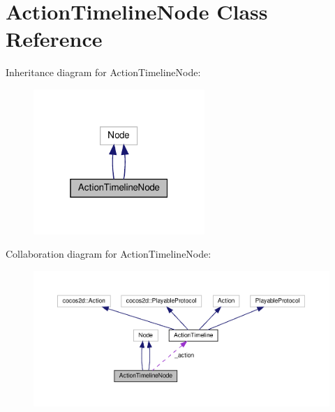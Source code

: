 \hypertarget{classActionTimelineNode}{}\section{Action\+Timeline\+Node Class Reference}
\label{classActionTimelineNode}


Inheritance diagram for Action\+Timeline\+Node\+:
\nopagebreak
\begin{figure}[H]
\begin{center}
\leavevmode
\includegraphics[width=184pt]{classActionTimelineNode__inherit__graph}
\end{center}
\end{figure}


Collaboration diagram for Action\+Timeline\+Node\+:
\nopagebreak
\begin{figure}[H]
\begin{center}
\leavevmode
\includegraphics[width=350pt]{classActionTimelineNode__coll__graph}
\end{center}
\end{figure}
